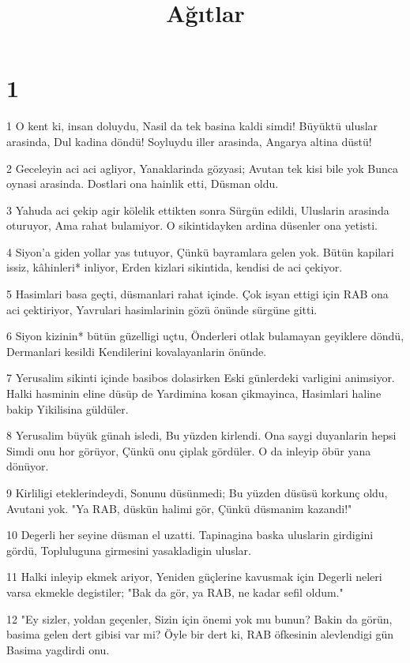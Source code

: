 

\title{Ağıtlar}


\chapter{1}

\par 1 O kent ki, insan doluydu, Nasil da tek basina kaldi simdi! Büyüktü uluslar arasinda, Dul kadina döndü! Soyluydu iller arasinda, Angarya altina düstü!
\par 2 Geceleyin aci aci agliyor, Yanaklarinda gözyasi; Avutan tek kisi bile yok Bunca oynasi arasinda. Dostlari ona hainlik etti, Düsman oldu.
\par 3 Yahuda aci çekip agir kölelik ettikten sonra Sürgün edildi, Uluslarin arasinda oturuyor, Ama rahat bulamiyor. O sikintidayken ardina düsenler ona yetisti.
\par 4 Siyon'a giden yollar yas tutuyor, Çünkü bayramlara gelen yok. Bütün kapilari issiz, kâhinleri* inliyor, Erden kizlari sikintida, kendisi de aci çekiyor.
\par 5 Hasimlari basa geçti, düsmanlari rahat içinde. Çok isyan ettigi için RAB ona aci çektiriyor, Yavrulari hasimlarinin gözü önünde sürgüne gitti.
\par 6 Siyon kizinin* bütün güzelligi uçtu, Önderleri otlak bulamayan geyiklere döndü, Dermanlari kesildi Kendilerini kovalayanlarin önünde.
\par 7 Yerusalim sikinti içinde basibos dolasirken Eski günlerdeki varligini animsiyor. Halki hasminin eline düsüp de Yardimina kosan çikmayinca, Hasimlari haline bakip Yikilisina güldüler.
\par 8 Yerusalim büyük günah isledi, Bu yüzden kirlendi. Ona saygi duyanlarin hepsi Simdi onu hor görüyor, Çünkü onu çiplak gördüler. O da inleyip öbür yana dönüyor.
\par 9 Kirliligi eteklerindeydi, Sonunu düsünmedi; Bu yüzden düsüsü korkunç oldu, Avutani yok. "Ya RAB, düskün halimi gör, Çünkü düsmanim kazandi!"
\par 10 Degerli her seyine düsman el uzatti. Tapinagina baska uluslarin girdigini gördü, Topluluguna girmesini yasakladigin uluslar.
\par 11 Halki inleyip ekmek ariyor, Yeniden güçlerine kavusmak için Degerli neleri varsa ekmekle degistiler; "Bak da gör, ya RAB, ne kadar sefil oldum."
\par 12 "Ey sizler, yoldan geçenler, Sizin için önemi yok mu bunun? Bakin da görün, basima gelen dert gibisi var mi? Öyle bir dert ki, RAB öfkesinin alevlendigi gün Basima yagdirdi onu.
